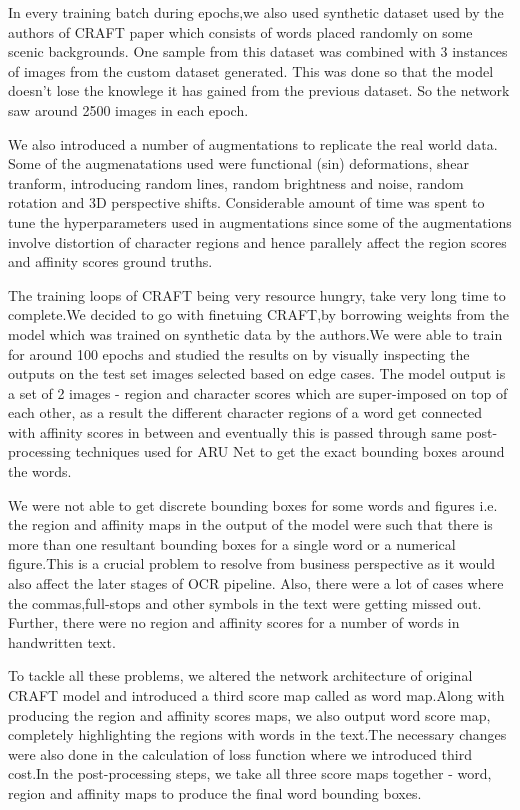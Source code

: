 In every training batch during epochs,we also used synthetic dataset used by the authors of CRAFT paper which consists of words placed randomly on some scenic backgrounds. One sample from this dataset was combined with 3 instances of images from the custom dataset generated. This was done so that the model doesn't lose the knowlege it has gained from the previous dataset. So the network saw around 2500 images in each epoch.

We also introduced a number of augmentations to replicate the real world data. Some of the augmenatations used were functional (sin) deformations, shear tranform, introducing random lines, random brightness and noise, random rotation and 3D perspective shifts. Considerable amount of time was spent to tune the hyperparameters used in augmentations since some of the augmentations involve distortion of character regions and hence parallely affect the region scores and affinity scores ground truths.

The training loops of CRAFT being very resource hungry, take very long time to complete.We decided to go with finetuing CRAFT,by borrowing weights from the model which was trained on synthetic data by the authors.We were able to train for around 100 epochs and studied the results on by visually inspecting the outputs on the test set images selected based on edge cases. 
The model output is a set of 2 images - region and character scores which are super-imposed on top of each other, as a result the different character regions of a word get connected with affinity scores in between and eventually this is passed through same post-processing techniques used for ARU Net to get the exact bounding boxes around the words.


We were not able to get discrete bounding boxes for some words and figures i.e. the region and affinity maps in the output of the model were such that there is more than one resultant bounding boxes for a single word or a numerical figure.This is a crucial problem to resolve from business perspective as it would also affect the later stages of OCR pipeline. Also, there were a lot of cases where the commas,full-stops and other symbols in the text were getting missed out. Further, there were no region and affinity scores for a number of words in handwritten text.

To tackle all these problems, we altered the network architecture of original CRAFT model and introduced a third score map called as word map.Along with producing the region and affinity scores maps, we also output word score map, completely highlighting the regions with words in the text.The necessary changes were also done in the calculation of loss function where we introduced third cost.In the post-processing steps, we take all three score maps together - word, region and affinity maps to produce the final word bounding boxes.

